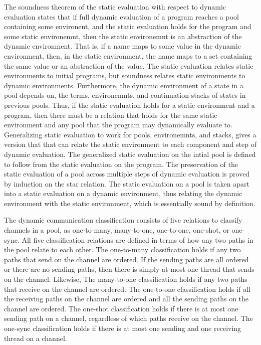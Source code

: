 \documentclass[letterpaper, 11pt]{report}
\begin{document}
The soundness theorem of the static evaluation with respect to dynamic evaluation states that if full dynamic evaluation
of a program reaches a pool containing some environent, and the static evaluation holds for the program and some
static environemnt, then the static environemnt is an abstraction of the dynamic environment. That is, if a name maps
to some value in the dynamic environment, then, in the static environment, the name maps to a set containing the same value
or an abstraction of the value. The static evaluation relates static environments to initial programs,
but soundness relates static environments
to dynamic environments. Furthermore, the dynamic environment of a state in a pool depends on, the terms, environemnts,
and continuation stacks of states in previous pools.
Thus, if the static evaluation holds for a static environment and a program,
then there must be a relation that holds for the same static environment and
any pool that the program may dynamically evaluate to. 
Generalizing static evaluation to work for pools, environemnts, and stacks, gives a version that
that can relate the static environment to each component and step of dynamic evaluation.
The generalized static evaluation on the intial pool is defined to follow from the static evaluation on the program.
The preservation of the static evaluation of a pool across multiple steps of dynamic evaluation is proved by induction on
the star relation. The static evaluation on a pool is taken apart into a static evaluation on a dynamic environment,
thus relating the dynamic environment with the static environment, which is essentially sound by definition. 


The dynamic communication classification consists of five relations to classify channels in a pool, as one-to-many,
many-to-one, one-to-one, one-shot, or one-sync. All five classification relations are defined in terms of how any two paths   
in the pool relate to each other. The one-to-many classification holds if any two paths that send on the channel are ordered. 
If the sending paths are all ordered or there are no sending paths, then there is simply at most one thread that
sends on the channel. Likewise, The many-to-one classification holds if any two paths that receive on the channel are ordered.
The one-to-one classification holds if all the receiving paths on the channel are ordered and all the sending paths on the
channel are ordered. The one-shot classification holds if there is at most one sending path on a channel, regardless
of which paths receive on the channel. The one-sync classification holds if there is at most one sending and one receiving thread on a channel.
\end{document}
